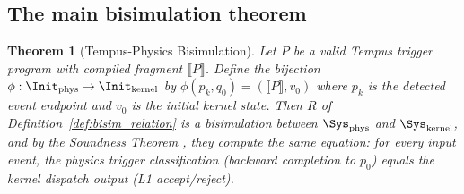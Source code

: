 \documentclass[twocolumn,10pt,a4paper]{article}
\theoremstyle{thmstyle}
\newtheorem{theorem}{Theorem}[section]
\theoremstyle{definition}
\theoremstyle{remark}
\begin{document}
\subsection{The main bisimulation theorem}

\begin{theorem}[Tempus-Physics Bisimulation]
\label{thm:main_bisim}
Let $P$ be a valid Tempus trigger program with compiled fragment
$\llbracket P \rrbracket$. Define the bijection $\phi : \Init_{\mathrm{phys}}
\to \Init_{\mathrm{kernel}}$ by $\phi(p_k, q_0) = (\llbracket P \rrbracket, v_0)$
where $p_k$ is the detected event endpoint and $v_0$ is the initial kernel
state. Then $R$ of Definition~\ref{def:bisim_relation} is a bisimulation
between $\Sys_{\mathrm{phys}}$ and $\Sys_{\mathrm{kernel}}$, and by the
Soundness Theorem \citep{companion:bisim}, they compute the same equation:
for every input event, the physics trigger classification (backward
completion to $p_0$) equals the kernel dispatch output (L1 accept/reject).
\end{theorem}
\end{document}
